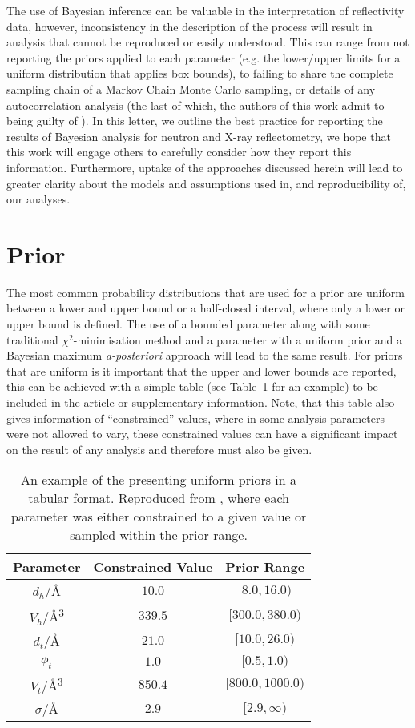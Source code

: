 \documentclass[reprint,superscriptaddress,aps,amsmath,linenumbers]{revtex4-2}
\begin{document}
The use of Bayesian inference can be valuable in the interpretation of reflectivity data, however, inconsistency in the description of the process will result in analysis that cannot be reproduced or easily understood. 
This can range from not reporting the priors applied to each parameter (e.g. the lower/upper limits for a uniform distribution that applies box bounds), to failing to share the complete sampling chain of a Markov Chain Monte Carlo sampling, or details of any autocorrelation analysis (the last of which, the authors of this work admit to being guilty of \cite{mccluskey_bayesian_2019}). 
In this letter, we outline the best practice for reporting the results of Bayesian analysis for neutron and X-ray reflectometry, we hope that this work will engage others to carefully consider how they report this information. 
Furthermore, uptake of the approaches discussed herein will lead to greater clarity about the models and assumptions used in, and reproducibility of, our analyses.

\section{Prior}
\label{sec:prior}

The most common probability distributions that are used for a prior are uniform between a lower and upper bound or a half-closed interval, where only a lower or upper bound is defined.
The use of a bounded parameter along with some traditional $\chi^2$-minimisation method and a parameter with a uniform prior and a Bayesian maximum \emph{a-posteriori} approach will lead to the same result. 
For priors that are uniform is it important that the upper and lower bounds are reported, this can be achieved with a simple table  (see Table~\ref{tab:bounds} for an example) to be included in the article or supplementary information. 
Note, that this table also gives information of ``constrained'' values, where in some analysis parameters were not allowed to vary, these constrained values can have a significant impact on the result of any analysis and therefore must also be given.
%
\begin{table}
    \caption{An example of the presenting uniform priors in a tabular format. Reproduced from \cite{mccluskey_general_2020}, where each parameter was either constrained to a given value or sampled within the prior range.}
    \label{tab:bounds}
    \begin{tabular}{c| c | c}
        Parameter & Constrained Value & Prior Range \\ 
        \hline
        $d_h$/\si{\angstrom} & $10.0$ & $[8.0, 16.0)$\\
        $V_h$/\si{\angstrom^3} & $339.5$ & $[300.0, 380.0)$\\
        $d_t$/\si{\angstrom} & $21.0$ & $[10.0, 26.0)$\\
        $\phi_t$ & $1.0$ & $[0.5, 1.0)$\\
        $V_t$/\si{\angstrom^3} & $850.4$ & $[800.0, 1000.0)$\\
        $\sigma$/\si{\angstrom} & $2.9$ & $[2.9, \infty)$\\
    \end{tabular}
\end{table}
%
\end{document}
